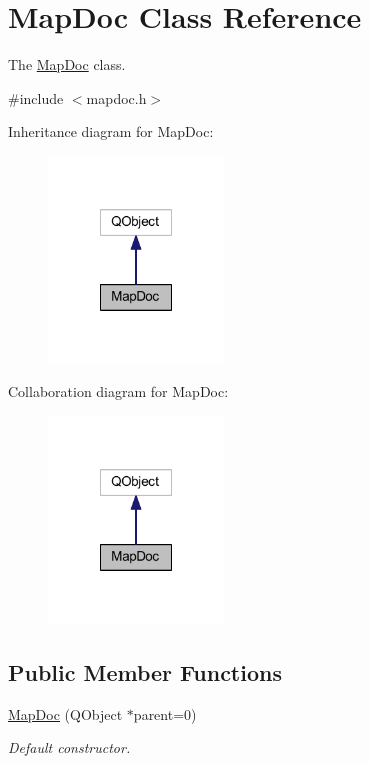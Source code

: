 \hypertarget{class_map_doc}{\section{Map\-Doc Class Reference}
\label{class_map_doc}
}


The \hyperlink{class_map_doc}{Map\-Doc} class.  




{\ttfamily \#include $<$mapdoc.\-h$>$}



Inheritance diagram for Map\-Doc\-:\nopagebreak
\begin{figure}[H]
\begin{center}
\leavevmode
\includegraphics[width=132pt]{class_map_doc__inherit__graph}
\end{center}
\end{figure}


Collaboration diagram for Map\-Doc\-:\nopagebreak
\begin{figure}[H]
\begin{center}
\leavevmode
\includegraphics[width=132pt]{class_map_doc__coll__graph}
\end{center}
\end{figure}
\subsection*{Public Member Functions}
\begin{DoxyCompactItemize}
\item 
\hyperlink{class_map_doc_a2bea048c6b43333dc27fb4ca5ed84a95}{Map\-Doc} (Q\-Object $\ast$parent=0)
\begin{DoxyCompactList}\small\item\em Default constructor. \end{DoxyCompactList}\end{DoxyCompactItemize}
